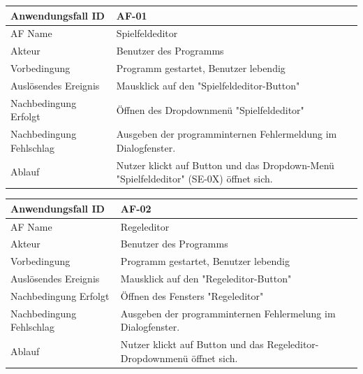 \documentclass[11pt,a4paper]{article}
\begin{document}
\pagebreak

\begin{tabular}[m]{|m{7cm}|m{9cm}|}
    \hline
    Anwendungsfall ID     & AF-01 \\
         \hline
    AF Name     &  Spielfeldeditor \\
         \hline
    Akteur&Benutzer des Programms \\
    \hline
    Vorbedingung&Programm gestartet, Benutzer lebendig\\
    \hline
    Auslösendes Ereignis&Mausklick auf den "Spielfeldeditor-Button"\\
    \hline
    Nachbedingung Erfolgt&Öffnen des Dropdownmenü "Spielfeldeditor"\\
    \hline
    Nachbedingung Fehlschlag&Ausgeben der programminternen Fehlermeldung im Dialogfenster.\\
    \hline
    Ablauf&Nutzer klickt auf Button und das Dropdown-Menü "Spielfeldeditor" (SE-0X) öffnet sich.\\
    \hline
\end{tabular}
\par


\begin{tabular}[m]{|m{7cm}|m{9cm}|}
    \hline
    Anwendungsfall ID     & AF-02 \\
         \hline
    AF Name     &  Regeleditor \\
         \hline
    Akteur&Benutzer des Programms \\
    \hline
    Vorbedingung&Programm gestartet, Benutzer lebendig\\
    \hline
    Auslösendes Ereignis&Mausklick auf den "Regeleditor-Button"\\
    \hline
    Nachbedingung Erfolgt&Öffnen des Fensters "Regeleditor"\\
    \hline
    Nachbedingung Fehlschlag&Ausgeben der programminternen Fehlermelung im Dialogfenster.\\
    \hline
    Ablauf&Nutzer klickt auf Button und das Regeleditor-Dropdownmenü öffnet sich.\\
    \hline
\end{tabular}
\par
\end{document}
